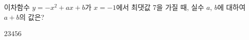 이차함수 $y=-x^2+ax+b$가 $x=-1$에서 최댓값 7을 가질 때, 실수 $a$, $b$에 대하여 $a+b$의 값은?
\begin{choices32}{$2$}{$3$}{$4$}{$5$}{$6$}\end{choices32}
